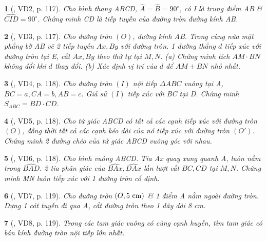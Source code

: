 \documentclass{article}
\newtheorem{baitoan}{}
\begin{document}
\begin{baitoan}[\cite{Binh_boi_duong_Toan_9_tap_1}, VD2, p. 117]
	Cho hình thang ABCD, $\widehat{A} = \widehat{B} = 90^\circ$, có I là trung điểm AB \& $\widehat{CID} = 90^\circ$. Chứng minh CD là tiếp tuyến của đường tròn đường kính AB.
\end{baitoan}

\begin{baitoan}[\cite{Binh_boi_duong_Toan_9_tap_1}, VD3, p. 117]
	Cho đường tròn $(O)$, đường kính AB. Trong cùng nửa mặt phẳng bờ AB vẽ 2 tiếp tuyến $Ax,By$ với đường tròn. 1 đường thẳng $d$ tiếp xúc với đường tròn tại E, cắt $Ax,By$ theo thứ tự tại $M,N$. (a) Chứng minh tích $AM\cdot BN$ không đổi khi $d$ thay đổi. (b) Xác định vị trí của $d$ để $AM + BN$ nhỏ nhất.
\end{baitoan}

\begin{baitoan}[\cite{Binh_boi_duong_Toan_9_tap_1}, VD4, p. 118]
	Cho đường tròn $(I)$ nội tiếp $\Delta ABC$ vuông tại A, $BC = a,CA = b,AB = c$. Giả sử $(I)$ tiếp xúc với BC tại D. Chứng minh $S_{ABC} = BD\cdot CD$.
\end{baitoan}

\begin{baitoan}[\cite{Binh_boi_duong_Toan_9_tap_1}, VD5, p. 118]
	Cho tứ giác ABCD có tất cả các cạnh tiếp xúc với đường tròn $(O)$, đồng thời tất cả các cạnh kéo dài của nó tiếp xúc với đường tròn $(O')$. Chứng minh 2 đường chéo của tứ giác ABCD vuông góc với nhau.
\end{baitoan}

\begin{baitoan}[\cite{Binh_boi_duong_Toan_9_tap_1}, VD6, p. 118]
	Cho hình vuông ABCD. Tia Ax quay xung quanh A, luôn nằm trong $\widehat{BAD}$. 2 tia phân giác của $\widehat{BAx},\widehat{DAx}$ lần lượt cắt $BC,CD$ tại $M,N$. Chứng minh MN luôn tiếp xúc với 1 đường tròn cố định.
\end{baitoan}

\begin{baitoan}[\cite{Binh_boi_duong_Toan_9_tap_1}, VD7, p. 119]
	Cho đường tròn $(O,5\ {\rm cm})$ \& 1 điểm A nằm ngoài đường tròn. Dựng 1 cát tuyến đi qua A, cắt đường tròn theo 1 dây dài {\rm8 cm}.
\end{baitoan}

\begin{baitoan}[\cite{Binh_boi_duong_Toan_9_tap_1}, VD8, p. 119]
	Trong các tam giác vuông có cùng cạnh huyền, tìm tam giác có bán kính đường tròn nội tiếp lớn nhất.
\end{baitoan}
\end{document}
